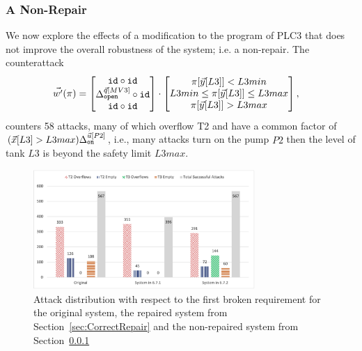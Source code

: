 {{\subsubsection{A Non-Repair} 
\label{sec:NonRepair} We now explore the effects of a modification to the program of PLC3 that does not improve the overall robustness of the system; i.e. a non-repair. The counterattack 
\begin{align*}
    \vec{w'}(\pi)&=
    \begin{bmatrix}
     {\texttt{id}}\circ {\texttt{id}} \\
     {\Delta}^{\vec{q}[MV3]}_{\texttt{open}}\circ {\texttt{id}} \\
     {\texttt{id}}\circ {\texttt{id}} \\
    \end{bmatrix}
    \cdot
    \begin{bmatrix}
      \pi[\vec{y}[L3]]<L3min \\
      L3min \leq \pi[\vec{y}[L3]]\leq L3max \\
      \pi[\vec{y}[L3]]>L3max
    \end{bmatrix},
  \end{align*} 
counters 58 attacks, many of which overflow T2 and have a common factor of $(\vec{x}[L3]>L3max){\Delta}^{\vec{u}[P2]}_{\texttt{on}}$, i.e., many attacks turn on the pump $P2$ then the level of tank $L3$ is beyond the safety limit $L3max$. 
\begin{figure}[t]
  \includegraphics[width=0.75\textwidth]{Figures/AttackDistribution.png} 
  \caption{Attack distribution with respect to the first broken requirement for the original system, the repaired system from Section~\ref{sec:CorrectRepair} and the non-repaired system from Section~\ref{sec:NonRepair}}

\end{figure}}}
